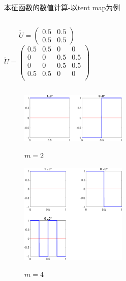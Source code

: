 \documentclass{beamer}
\begin{document}
 		\begin{frame}{本征函数的数值计算-以tent map为例}
 			\begin{columns}[c]
 			\begin{equation*}
 			\tilde{U}=\begin{pmatrix}
 			0.5 & 0.5 \\
 			0.5 & 0.5
 			\end{pmatrix}
 			\end{equation*}
 			\begin{equation*}
 			\tilde{U}=\begin{pmatrix}
 			0.5 & 0.5 & 0 & 0 \\
 			0 & 0 & 0.5 & 0.5 \\
 			0 & 0 & 0.5 & 0.5 \\
 			0.5 & 0.5 & 0 & 0 \\
 			\end{pmatrix}
 			\end{equation*}
 		    \end{columns}
 			\begin{figure}
 				\begin{minipage}{0.45\linewidth}
 					\centerline{\includegraphics[width=2in]{images/02a-Koopman_eig2.eps}}
 					\centerline{$m=2$}
 				\end{minipage}
 				\hfill
 				\begin{minipage}{0.45\linewidth}
 					\centerline{\includegraphics[width=2in]{images/02b-Koopman_eig4.eps}}
 					\centerline{$m=4$}
 				\end{minipage}
 			\end{figure}
 		\end{frame}
\end{document}

